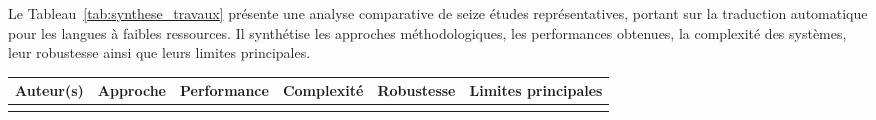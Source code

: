 Le Tableau~\ref{tab:synthese_travaux} présente une analyse comparative de seize études représentatives, portant sur la traduction automatique pour les langues à faibles ressources. Il synthétise les approches méthodologiques, les performances obtenues, la complexité des systèmes, leur robustesse ainsi que leurs limites principales.

\begingroup
\renewcommand{\arraystretch}{1.4}
\small
{}
\begin{longtable}{p{2.8cm}p{2.8cm}p{2.2cm}p{1.9cm}p{1.9cm}p{3.2cm}}
\toprule
\textbf{Auteur(s)} & \textbf{Approche} & \textbf{Performance} & \textbf{Complexité} & \textbf{Robustesse} & \textbf{Limites principales} \\
\midrule
\endfirsthead
\endhead

\bottomrule
\endfoot


\end{longtable}
